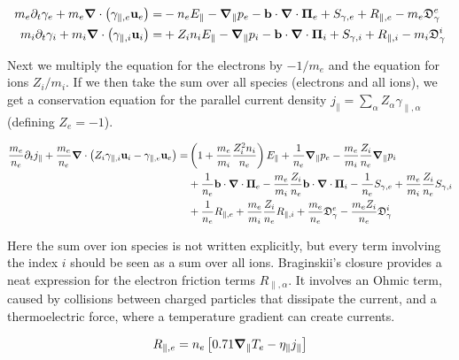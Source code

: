 \begin{align}
	m_e\partial_t \gamma_{e} + m_e\grad\cdot\left(\gamma_{\parallel,e}\mathbf{u}_e\right) =& -n_eE_\parallel -\grad_\parallel{p_e} - \mathbf{b}\cdot\grad\cdot\boldsymbol{\Pi}_e + S_{\gamma,e} + R_{\parallel,e} - m_e\mathfrak{D}_\gamma^e \label{eq:derivationEI_electronParaMomenentum} \\
	m_i\partial_t \gamma_{i} + m_i\grad\cdot\left(\gamma_{\parallel,i}\mathbf{u}_i\right) =& + Z_in_iE_\parallel -\grad_\parallel{p_i} - \mathbf{b}\cdot\grad\cdot\boldsymbol{\Pi}_i + S_{\gamma,i} + R_{\parallel,i} - m_i\mathfrak{D}_\gamma^i \label{eq:derivationEI_ionParaMomenentum}
\end{align}

Next we multiply the equation for the electrons by $-1/m_e$ and the equation for ions $Z_i/m_i$. If we then take the sum over all species (electrons and all ions), we get a conservation equation for the parallel current density $j_\parallel = \sum_{\alpha} Z_\alpha \gamma_{\parallel,\alpha} $ (defining $Z_e = -1$).

\begin{align}
	\label{eq:S3X_differenceGammaeGammai}
	\frac{m_e}{n_e}\partial_t j_\parallel + \frac{m_e}{n_e}\grad\cdot\left(Z_i\gamma_{\parallel,i}\mathbf{u}_i - \gamma_{\parallel,e}\mathbf{u}_e\right) = &  
	\left(1 + \frac{m_e}{m_i}\frac{Z_i^2n_i}{n_e}\right)E_\parallel + \frac{1}{n_e}\grad_\parallel{p_e} - \frac{m_e}{m_i}\frac{Z_i}{n_e}\grad_\parallel{p_i} \nonumber \\ 
	&+ \frac{1}{n_e}\mathbf{b}\cdot\grad\cdot\boldsymbol{\Pi}_e - \frac{m_e}{m_i}\frac{Z_i}{n_e}\mathbf{b}\cdot\grad\cdot\boldsymbol{\Pi}_i - \frac{1}{n_e}S_{\gamma,e} + \frac{m_e}{m_i}\frac{Z_i}{n_e}S_{\gamma,i} \nonumber \\ 
	&+ \frac{1}{n_e}R_{\parallel,e} + \frac{m_e}{m_i}\frac{Z_i}{n_e}R_{\parallel,i} + \frac{m_e}{n_e}\mathfrak{D}_\gamma^e - \frac{m_eZ_i}{n_e}\mathfrak{D}_\gamma^i
\end{align}

Here the sum over ion species is not written explicitly, but every term involving the index $i$ should be seen as a sum over all ions. Braginskii's closure provides a neat expression for the electron friction terms $R_{\parallel,\alpha}$. It involves an Ohmic term, caused by collisions between charged particles that dissipate the current, and a thermoelectric force, where a temperature gradient can create currents. 

\begin{align}
	R_{\parallel,e} = n_e\left[0.71\grad_\parallel T_e - \eta_\parallel j_\parallel\right]
\end{align}

